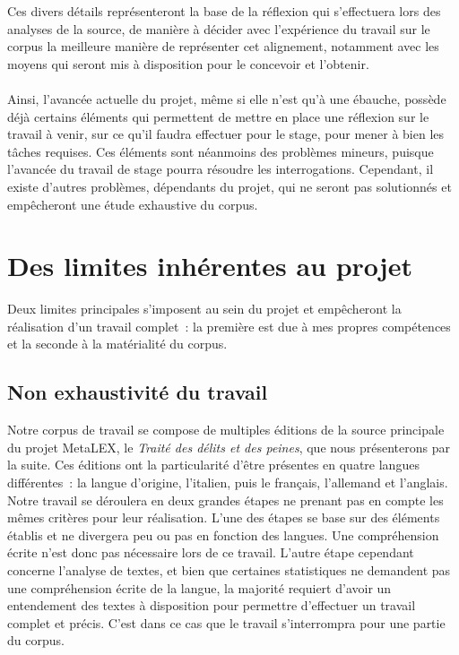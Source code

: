 Ces divers détails représenteront la base de la réflexion qui s'effectuera lors des analyses de la source, de manière à décider avec l'expérience du travail sur le corpus la meilleure manière de représenter cet alignement, notamment avec les moyens qui seront mis à disposition pour le concevoir et l'obtenir.

\paragraph{}Ainsi, l'avancée actuelle du projet, même si elle n'est qu'à une ébauche, possède déjà certains éléments qui permettent de mettre en place une réflexion sur le travail à venir, sur ce qu'il faudra effectuer pour le stage, pour mener à bien les tâches requises. Ces éléments sont néanmoins des problèmes mineurs, puisque l'avancée du travail de stage pourra résoudre les interrogations. Cependant, il existe d'autres problèmes, dépendants du projet, qui ne seront pas solutionnés et empêcheront une étude exhaustive du corpus.

\section{Des limites inhérentes au projet}
Deux limites principales s'imposent au sein du projet et empêcheront la réalisation d'un travail complet~: la première est due à mes propres compétences et la seconde à la matérialité du corpus.

\subsection{Non exhaustivité du travail}
Notre corpus de travail se compose de multiples éditions de la source principale du projet MetaLEX, le \emph{Traité des délits et des peines}, que nous présenterons par la suite. Ces éditions ont la particularité d'être présentes en quatre langues différentes~: la langue d'origine, l'italien, puis le français, l'allemand et l'anglais. Notre travail se déroulera en deux grandes étapes ne prenant pas en compte les mêmes critères pour leur réalisation. L'une des étapes se base sur des éléments établis et ne divergera peu ou pas en fonction des langues. Une compréhension écrite n'est donc pas nécessaire lors de ce travail. L'autre étape cependant concerne l'analyse de textes, et bien que certaines statistiques ne demandent pas une compréhension écrite de la langue, la majorité requiert d'avoir un entendement des textes à disposition pour permettre d'effectuer un travail complet et précis. C'est dans ce cas que le travail s'interrompra pour une partie du corpus. 

